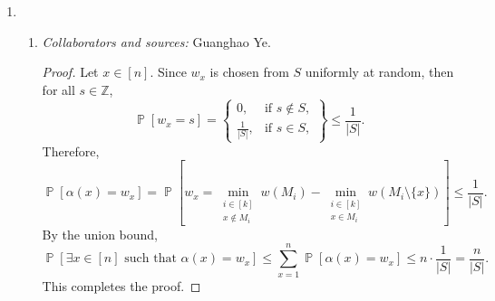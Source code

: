 \documentclass[letterpaper, reqno,11pt]{article}
\newcommand{\ZZ}{\mathbb{Z}}
\newcommand{\PP}{\mathop{{}\mathbb{P}}}
\begin{document}
\begin{enumerate}
\begin{enumerate}
    \clearpage

    \item \noindent\emph{Collaborators and sources:} none.

    \bigskip

    \begin{proof}
      Note that any algorithm which generates $n$ pairwise independent random bits samples a vector $\mathbf x$ from a pairwise independent space $S = \{ \mathbf x^{(1)}, \ldots, \mathbf x^{(s)} \}$ on $n$ variables. By part (b), any pairwise independent space $S$ on $n$ variables has size $|S| \geq n$. Therefore, any algorithm that generates $n$ pairwise independent random bits requires at least $\log n$ truly random bits to sample a vector from a space of size $n$. This implies that the construction is optimal, completing the proof.
    \end{proof}
  \end{enumerate}

  \clearpage

  \item \begin{enumerate}
    \item \noindent\emph{Collaborators and sources:} Guanghao Ye.

    \bigskip

    \begin{proof}
      Let $x \in [n]$. Since $w_x$ is chosen from $S$ uniformly at random, then for all $s \in \ZZ$,
      $$ \PP\left[w_x = s\right] = \left\{
        \begin{array}{ll}
          0, & \text{if $s \not \in S$}, \\
          \frac{1}{|S|}, & \text{if $s \in S$},
        \end{array}
      \right\} \leq \frac{1}{|S|}. $$
      Therefore,
      $$ \PP[\alpha(x) = w_x] = \PP\left[w_x = \min_{\substack{i \in [k] \\ x \not \in M_i}} w\left(M_i\right) - \min_{\substack{i \in [k] \\ x \in M_i}} w\left(M_i \setminus \{ x \}\right)\right] \leq \frac{1}{|S|}. $$
      By the union bound,
      $$ \PP\left[\exists x \in [n] \text{ such that } \alpha(x) = w_x\right] \leq \sum_{x = 1}^n \PP\left[\alpha(x) = w_x\right] \leq n \cdot \frac{1}{|S|} = \frac{n}{|S|}. $$
      This completes the proof.
    \end{proof}
  \end{enumerate}
\end{enumerate}
\end{document}
